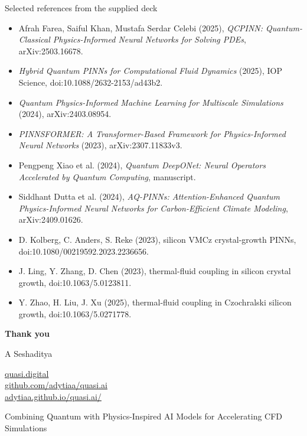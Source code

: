 \documentclass[aspectratio=169,10pt]{beamer}
\begin{document}
\begin{frame}{Selected references from the supplied deck}
\scriptsize
\begin{itemize}
  \item Afrah Farea, Saiful Khan, Mustafa Serdar Celebi (2025), \emph{QCPINN: Quantum-Classical Physics-Informed Neural Networks for Solving PDEs}, arXiv:2503.16678.
  \item \emph{Hybrid Quantum PINNs for Computational Fluid Dynamics} (2025), IOP Science, doi:10.1088/2632-2153/ad43b2.
  \item \emph{Quantum Physics-Informed Machine Learning for Multiscale Simulations} (2024), arXiv:2403.08954.
  \item \emph{PINNSFORMER: A Transformer-Based Framework for Physics-Informed Neural Networks} (2023), arXiv:2307.11833v3.
  \item Pengpeng Xiao et al. (2024), \emph{Quantum DeepONet: Neural Operators Accelerated by Quantum Computing}, manuscript.
  \item Siddhant Dutta et al. (2024), \emph{AQ-PINNs: Attention-Enhanced Quantum Physics-Informed Neural Networks for Carbon-Efficient Climate Modeling}, arXiv:2409.01626.
  \item D. Kolberg, C. Anders, S. Reke (2023), silicon VMCz crystal-growth PINNs, doi:10.1080/00219592.2023.2236656.
  \item J. Ling, Y. Zhang, D. Chen (2023), thermal-fluid coupling in silicon crystal growth, doi:10.1063/5.0123811.
  \item Y. Zhao, H. Liu, J. Xu (2025), thermal-fluid coupling in Czochralski silicon growth, doi:10.1063/5.0271778.
\end{itemize}
\end{frame}

\begin{frame}[plain]
\vspace{1.0cm}
{\color{white}\fontsize{30}{36}\selectfont\bfseries Thank you\par}
\vspace{0.35cm}
{\color{white!85}\large A Seshaditya\par}
\vspace{0.1cm}
{\color{white!75}\normalsize
\href{https://quasi.digital}{quasi.digital}\\
\href{https://github.com/adytiaa/quasi.ai}{github.com/adytiaa/quasi.ai}\\
\href{https://adytiaa.github.io/quasi.ai/}{adytiaa.github.io/quasi.ai/}\par}
\vfill
{\color{white!65}\small Combining Quantum with Physics-Inspired AI Models for Accelerating CFD Simulations\par}
\end{frame}
\end{document}
